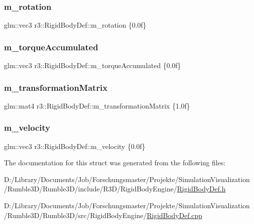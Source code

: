 \subsubsection{\texorpdfstring{m\+\_\+rotation}{m\_rotation}}
{\footnotesize\ttfamily glm\+::vec3 r3\+::\+Rigid\+Body\+Def\+::m\+\_\+rotation \{0.\+0f\}}

\mbox{\label{structr3_1_1_rigid_body_def_ab12c90dd6547748d3d7f27e53833a9e6}} 
\subsubsection{\texorpdfstring{m\+\_\+torque\+Accumulated}{m\_torqueAccumulated}}
{\footnotesize\ttfamily glm\+::vec3 r3\+::\+Rigid\+Body\+Def\+::m\+\_\+torque\+Accumulated \{0.\+0f\}}

\mbox{\label{structr3_1_1_rigid_body_def_a5110c4790357fbbfad4d5cc5dd89c4d6}} 
\subsubsection{\texorpdfstring{m\+\_\+transformation\+Matrix}{m\_transformationMatrix}}
{\footnotesize\ttfamily glm\+::mat4 r3\+::\+Rigid\+Body\+Def\+::m\+\_\+transformation\+Matrix \{1.\+0f\}}

\mbox{\label{structr3_1_1_rigid_body_def_a3acdc6c652745324b72165c6fc42bc39}} 
\subsubsection{\texorpdfstring{m\+\_\+velocity}{m\_velocity}}
{\footnotesize\ttfamily glm\+::vec3 r3\+::\+Rigid\+Body\+Def\+::m\+\_\+velocity \{0.\+0f\}}



The documentation for this struct was generated from the following files\+:\begin{DoxyCompactItemize}
\item 
D\+:/\+Library/\+Documents/\+Job/\+Forschungsmaster/\+Projekte/\+Simulation\+Visualization/\+Rumble3\+D/\+Rumble3\+D/include/\+R3\+D/\+Rigid\+Body\+Engine/\mbox{\hyperlink{_rigid_body_def_8h}{Rigid\+Body\+Def.\+h}}\item 
D\+:/\+Library/\+Documents/\+Job/\+Forschungsmaster/\+Projekte/\+Simulation\+Visualization/\+Rumble3\+D/\+Rumble3\+D/src/\+Rigid\+Body\+Engine/\mbox{\hyperlink{_rigid_body_def_8cpp}{Rigid\+Body\+Def.\+cpp}}\end{DoxyCompactItemize}
